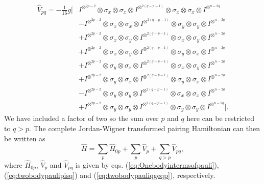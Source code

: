 \begin{align}
    \label{eq:twobodypauliqgeqp}
       \hat{V}_{pq} = -\frac{1}{16}g [& I^{\otimes^{2p -2}} \otimes \sigma_x \otimes \sigma_x \otimes I^{\otimes^{2(q - p - 1)}} \otimes \sigma_x \otimes \sigma_x \otimes I^{\otimes^{n-2q}} \nonumber \\
        & -I^{\otimes^{2p -2}} \otimes \sigma_x \otimes \sigma_x \otimes I^{\otimes^{2(q - p - 1)}} \otimes \sigma_y \otimes \sigma_y \otimes I^{\otimes^{n-2q}} \nonumber \\
        & + I^{\otimes^{2p -2}} \otimes \sigma_x \otimes \sigma_y \otimes I^{\otimes^{2(q - p - 1)}} \otimes \sigma_x \otimes \sigma_y \otimes I^{\otimes^{n-2q}} \nonumber \\
        & + I^{\otimes^{2p -2}} \otimes \sigma_x \otimes \sigma_y \otimes I^{\otimes^{2(q - p - 1)}} \otimes \sigma_y \otimes \sigma_x \otimes I^{\otimes^{n-2q}}  \\
        &+ I^{\otimes^{2p -2}} \otimes \sigma_y \otimes \sigma_x \otimes I^{\otimes^{2(q - p - 1)}} \otimes \sigma_x \otimes \sigma_y \otimes I^{\otimes^{n-2q}} \nonumber \\
        & + I^{\otimes^{2p -2}} \otimes \sigma_y \otimes \sigma_x \otimes I^{\otimes^{2(q - p - 1)}} \otimes \sigma_y \otimes \sigma_x \otimes I^{\otimes^{n-2q}} \nonumber \\
        & - I^{\otimes^{2p -2}} \otimes \sigma_y \otimes \sigma_y \otimes I^{\otimes^{2(q - p - 1)}} \otimes \sigma_x \otimes \sigma_x \otimes I^{\otimes^{n-2q}} \nonumber \\
        &+ I^{\otimes^{2p -2}} \otimes \sigma_y \otimes \sigma_y \otimes I^{\otimes^{2(q - p - 1)}} \otimes \sigma_y \otimes \sigma_y \otimes I^{\otimes^{n-2q}}].\nonumber 
\end{align}
We have included a factor of two so the sum over $p$ and $q$ here can be restricted to $q > p$.
The complete Jordan-Wigner transformed pairing Hamiltonian can then be written as
\begin{equation}
    \label{eq:JordanWignerHamiltonian}
    \hat{H} = \sum_p \hat{H}_{0p} + \sum_{p} \hat{V}_p + \sum_{q > p} \hat{V}_{pq},
\end{equation}
where $\hat{H}_{0p}$, $\hat{V}_p$ and $\hat{V}_{pq}$ is given by eqs. (\ref{eq:Onebodyintermsofpauli}), (\ref{eq:twobodypaulipisq}) and (\ref{eq:twobodypauliqgeqp}), respectively.



